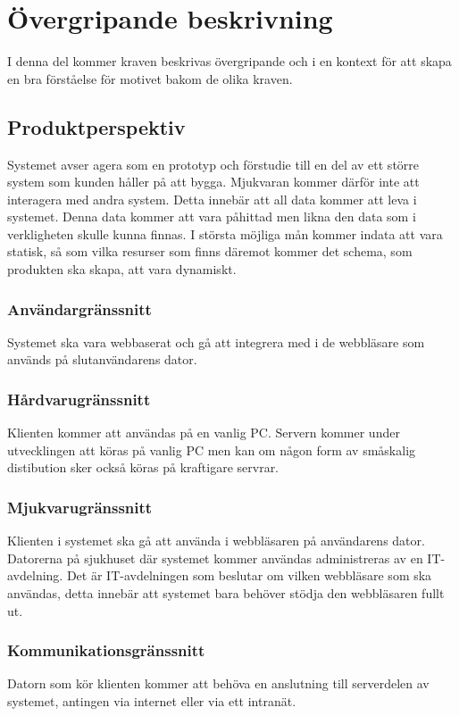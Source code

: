 \documentclass{article}
\begin{document}

\section{Övergripande beskrivning}
\label{sec:overall}
I denna del kommer kraven beskrivas övergripande och i en kontext för att
skapa en bra förståelse för motivet bakom de olika kraven.

\subsection{Produktperspektiv}
\label{subsec:Produktperspektiv}
Systemet avser agera som en prototyp och förstudie till en del av ett större
system som kunden håller på att bygga.
Mjukvaran kommer därför inte att interagera med andra system. Detta innebär att all
data kommer att leva i systemet. Denna data kommer att vara påhittad men likna
den data som i verkligheten skulle kunna finnas.
I största möjliga mån kommer indata att vara statisk, så som vilka resurser som
finns däremot kommer det schema, som produkten ska skapa, att vara dynamiskt.
\subsubsection{Användargränssnitt}
\label{subsec:Anvandargranssnitt}
Systemet ska vara webbaserat och gå att integrera med i de webbläsare som
används på slutanvändarens dator.
\subsubsection{Hårdvarugränssnitt}
\label{subsec:Hardvarugranssnitt}
Klienten kommer att användas på en vanlig PC. Servern kommer under utvecklingen
att köras på vanlig PC men kan om någon form av småskalig distibution sker
också köras på kraftigare servrar.
\subsubsection{Mjukvarugränssnitt}
\label{subsec:Mjukvarugranssnitt}
Klienten i systemet ska gå att använda i webbläsaren på användarens dator.
Datorerna på sjukhuset där systemet kommer användas administreras av en
IT-avdelning. Det är IT-avdelningen som beslutar om vilken webbläsare som ska
användas, detta innebär att systemet bara behöver stödja den webbläsaren fullt
ut.
\subsubsection{Kommunikationsgränssnitt}
\label{subsec:Kommunikationsgranssnitt}
Datorn som kör klienten kommer att behöva en
anslutning till serverdelen av systemet, antingen via internet eller via ett
intranät.
\end{document}
